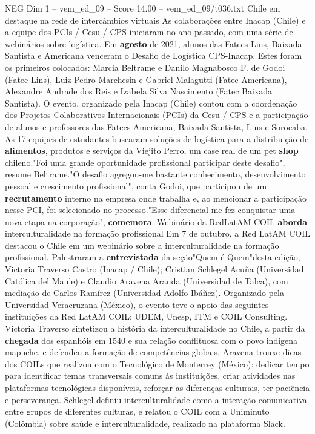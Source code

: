 \begin{textsample}{NEG Dim 1 – vem\_ed\_09 – Score 14.00 – vem\_ed\_09/t036.txt}  \label{ex:f1_neg_105}
Chile em destaque na rede de intercâmbios virtuais As colaborações entre Inacap (Chile) e a equipe dos PCIs / Cesu / CPS iniciaram no ano passado, com uma série de webinários sobre logística.
Em \textbf{agosto} de 2021, alunos das Fatecs Lins, Baixada Santista e Americana venceram o Desafio de Logística CPS-Inacap.
Estes foram os primeiros colocados: Marcia Beltrame e Danilo Magnabosco F. de Godoi (Fatec Lins), Luiz Pedro Marchesin e Gabriel Malagutti (Fatec Americana), Alexandre Andrade dos Reis e Izabela Silva Nascimento (Fatec Baixada Santista).
O evento, organizado pela Inacap (Chile) contou com a coordenação dos Projetos Colaborativos Internacionais (PCIs) da Cesu / CPS e a participação de alunos e professores das Fatecs Americana, Baixada Santista, Lins e Sorocaba.
As 17 equipes de estudantes buscaram soluções de logística para a distribuição de \textbf{alimentos}, produtos e serviços da Viejito Perro, um case real de um pet \textbf{shop} chileno."Foi uma grande oportunidade profissional participar deste desafio", resume Beltrame."O desafio agregou-me bastante conhecimento, desenvolvimento pessoal e crescimento profissional", conta Godoi, que participou de um \textbf{recrutamento} interno na empresa onde trabalha e, ao mencionar a participação nesse PCI, foi selecionado no processo."Esse diferencial me fez conquistar uma nova etapa na corporação", \textbf{comemora}.
Webinário da RedLatAM COIL \textbf{aborda} interculturalidade na formação profissional Em 7 de outubro, a Red LatAM COIL destacou o Chile em um webinário sobre a interculturalidade na formação profissional.
Palestraram a \textbf{entrevistada} da seção"Quem é Quem"desta edição, Victoria Traverso Castro (Inacap / Chile); Cristian Schlegel Acuña (Universidad Católica del Maule) e Claudio Aravena Aranda (Universidad de Talca), com mediação de Carlos Ramírez (Universidad Adolfo Ibáñez).
Organizado pela Universidad Veracruzana (México), o evento teve o apoio das seguintes instituições da Red LatAM COIL: UDEM, Unesp, ITM e COIL Consulting.
Victoria Traverso sintetizou a história da interculturalidade no Chile, a partir da \textbf{chegada} dos espanhóis em 1540 e sua relação conflituosa com o povo indígena mapuche, e defendeu a formação de competências globais.
Aravena trouxe dicas dos COILs que realizou com o Tecnológico de Monterrey (México): dedicar tempo para identificar temas transversais comuns às instituições, criar atividades nas plataformas tecnológicas disponíveis, reforçar as diferenças culturais, ter paciência e perseverança.
Schlegel definiu interculturalidade como a interação comunicativa entre grupos de diferentes culturas, e relatou o COIL com a Uniminuto (Colômbia) sobre saúde e interculturalidade, realizado na plataforma Slack.

\end{textsample}
